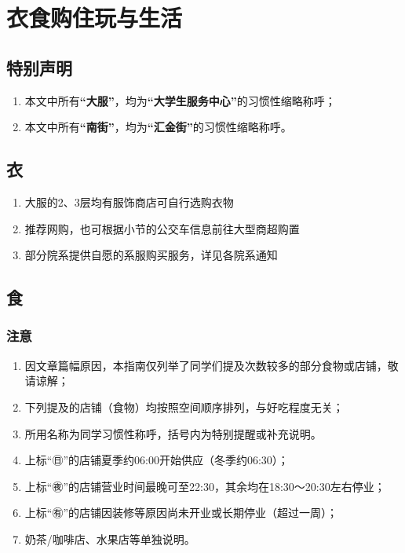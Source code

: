 \section[衣食购住玩与生活]{衣食购住玩与生活}

\subsection*{特别声明}
\begin{enumerate}
    \item 本文中所有\textbf{“大服”}，均为\textbf{“大学生服务中心”}的习惯性缩略称呼；
    \item 本文中所有\textbf{“南街”}，均为\textbf{“汇金街”}的习惯性缩略称呼。
\end{enumerate}
\subsection[衣]{衣}
\begin{enumerate}
    \item 大服的2、3层均有服饰商店可自行选购衣物
    \item 推荐网购，也可根据小节的公交车信息前往大型商超购置
    \item 部分院系提供自愿的系服购买服务，详见各院系通知
\end{enumerate}

\subsection[食]{食}
\subsubsection*{注意}
\begin{enumerate}
    \item 因文章篇幅原因，本指南仅列举了同学们提及次数较多的部分食物或店铺，敬请谅解；
    \item 下列提及的店铺（食物）均按照空间顺序排列，与好吃程度无关；
    \item 所用名称为同学习惯性称呼，括号内为特别提醒或补充说明。
    \item 上标“㊐”的店铺夏季约06:00开始供应（冬季约06:30）；
    \item 上标“㊰”的店铺营业时间最晚可至22:30，其余均在18:30～20:30左右停业；
    \item 上标“㊒”的店铺因装修等原因尚未开业或长期停业（超过一周）；
    \item 奶茶/咖啡店、水果店等单独说明。
\end{enumerate}

